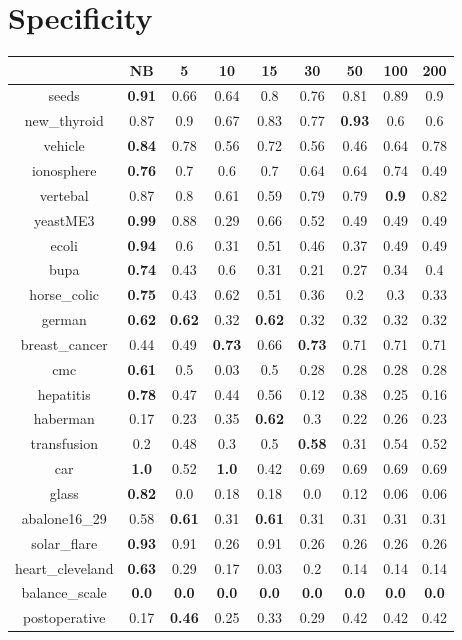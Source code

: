 \documentclass{article}%
\begin{document}
%
\section*{Specificity}%
\begin{tabular}{c|cccccccc}%
&NB&5&10&15&30&50&100&200\\%
\hline%
seeds&\textbf{0.91}&0.66&0.64&0.8&0.76&0.81&0.89&0.9\\%
new\_thyroid&0.87&0.9&0.67&0.83&0.77&\textbf{0.93}&0.6&0.6\\%
vehicle&\textbf{0.84}&0.78&0.56&0.72&0.56&0.46&0.64&0.78\\%
ionosphere&\textbf{0.76}&0.7&0.6&0.7&0.64&0.64&0.74&0.49\\%
vertebal&0.87&0.8&0.61&0.59&0.79&0.79&\textbf{0.9}&0.82\\%
yeastME3&\textbf{0.99}&0.88&0.29&0.66&0.52&0.49&0.49&0.49\\%
ecoli&\textbf{0.94}&0.6&0.31&0.51&0.46&0.37&0.49&0.49\\%
bupa&\textbf{0.74}&0.43&0.6&0.31&0.21&0.27&0.34&0.4\\%
horse\_colic&\textbf{0.75}&0.43&0.62&0.51&0.36&0.2&0.3&0.33\\%
german&\textbf{0.62}&\textbf{0.62}&0.32&\textbf{0.62}&0.32&0.32&0.32&0.32\\%
breast\_cancer&0.44&0.49&\textbf{0.73}&0.66&\textbf{0.73}&0.71&0.71&0.71\\%
cmc&\textbf{0.61}&0.5&0.03&0.5&0.28&0.28&0.28&0.28\\%
hepatitis&\textbf{0.78}&0.47&0.44&0.56&0.12&0.38&0.25&0.16\\%
haberman&0.17&0.23&0.35&\textbf{0.62}&0.3&0.22&0.26&0.23\\%
transfusion&0.2&0.48&0.3&0.5&\textbf{0.58}&0.31&0.54&0.52\\%
car&\textbf{1.0}&0.52&\textbf{1.0}&0.42&0.69&0.69&0.69&0.69\\%
glass&\textbf{0.82}&0.0&0.18&0.18&0.0&0.12&0.06&0.06\\%
abalone16\_29&0.58&\textbf{0.61}&0.31&\textbf{0.61}&0.31&0.31&0.31&0.31\\%
solar\_flare&\textbf{0.93}&0.91&0.26&0.91&0.26&0.26&0.26&0.26\\%
heart\_cleveland&\textbf{0.63}&0.29&0.17&0.03&0.2&0.14&0.14&0.14\\%
balance\_scale&\textbf{0.0}&\textbf{0.0}&\textbf{0.0}&\textbf{0.0}&\textbf{0.0}&\textbf{0.0}&\textbf{0.0}&\textbf{0.0}\\%
postoperative&0.17&\textbf{0.46}&0.25&0.33&0.29&0.42&0.42&0.42\\%
\end{tabular}
\end{document}
